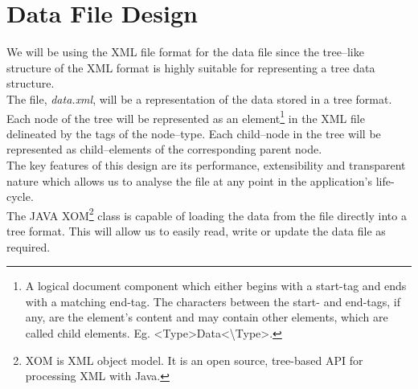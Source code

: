 \documentclass[10pt,a4paper]{report}
\begin{document}
\section{Data File Design}

We will be using the XML file format for the data file since the tree--like structure of the XML format is highly suitable for representing a tree data structure\cite{wikixml}. \\

The file, \textit{data.xml}, will be a representation of the data stored in a tree format. \\

Each node of the tree will be represented as an element\footnote{A logical document component which either begins with a start-tag and ends with a matching end-tag. The characters between the start- and end-tags, if any, are the element's content and may contain other elements, which are called child elements. Eg. \textless Type\textgreater Data\textless \textbackslash Type\textgreater.} in the XML file delineated by the tags of the node--type. 
Each child--node in the tree will be represented as child--elements of the corresponding parent node. \\

The key features of this design are its performance, extensibility and transparent nature which allows us to analyse the file at any point in the application's life-cycle. \\

The JAVA XOM\footnote{XOM is XML object model. It is an open source, tree-based API for processing XML with Java.} class is capable of loading the data from the file directly into a tree format. This will allow us to easily read, write or update the data file as required.
\end{document}

